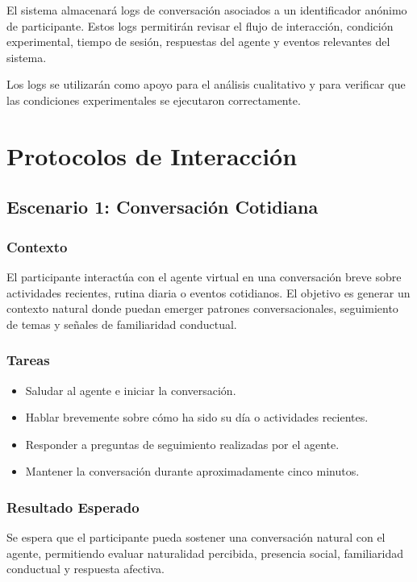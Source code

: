 \documentclass[12pt]{article}
\begin{document}
El sistema almacenará logs de conversación asociados a un identificador anónimo de participante. Estos logs permitirán revisar el flujo de interacción, condición experimental, tiempo de sesión, respuestas del agente y eventos relevantes del sistema.

Los logs se utilizarán como apoyo para el análisis cualitativo y para verificar que las condiciones experimentales se ejecutaron correctamente.

\section{Protocolos de Interacción}

\subsection{Escenario 1: Conversación Cotidiana}

\subsubsection{Contexto}

El participante interactúa con el agente virtual en una conversación breve sobre actividades recientes, rutina diaria o eventos cotidianos. El objetivo es generar un contexto natural donde puedan emerger patrones conversacionales, seguimiento de temas y señales de familiaridad conductual.

\subsubsection{Tareas}

\begin{itemize}
    \item Saludar al agente e iniciar la conversación.
    \item Hablar brevemente sobre cómo ha sido su día o actividades recientes.
    \item Responder a preguntas de seguimiento realizadas por el agente.
    \item Mantener la conversación durante aproximadamente cinco minutos.
\end{itemize}

\subsubsection{Resultado Esperado}

Se espera que el participante pueda sostener una conversación natural con el agente, permitiendo evaluar naturalidad percibida, presencia social, familiaridad conductual y respuesta afectiva.
\end{document}

